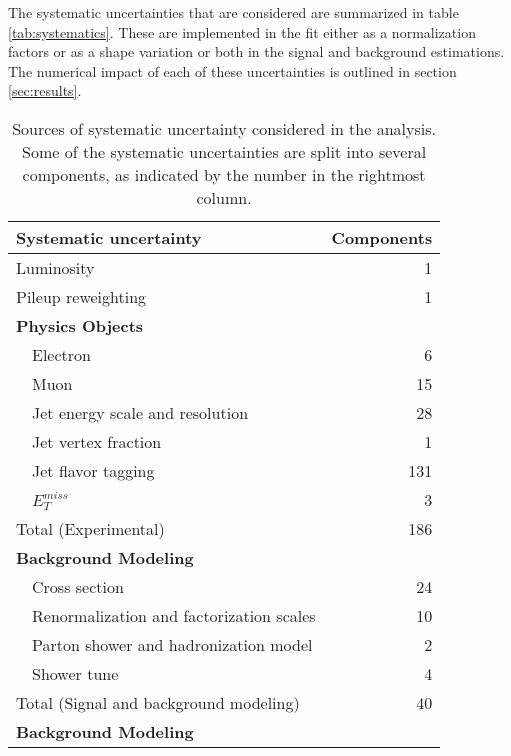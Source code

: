 The systematic uncertainties that are considered are summarized in table \ref{tab:systematics}. These are implemented in the fit either as a normalization factors or as a shape variation or both in the signal and background estimations. The numerical impact of each of these uncertainties is outlined in section \ref{sec:results}.

\begin{table}[h]
\centering
\caption{Sources of systematic uncertainty considered in the analysis.                                                                           
Some of the systematic uncertainties are split into several components, as indicated by the number in the rightmost column.}
\begin{tabular}{lr}
\hline\hline
Systematic uncertainty & Components           \\
\hline
\hline
Luminosity      & 1                   \\
Pileup reweighting      & 1                   \\
\textbf {Physics Objects}       &                     \\
\ \ Electron                                    & 6                   \\
\ \ Muon        & 15                  \\
\ \ Jet energy scale and resolution     & 28                  \\
\ \ Jet vertex fraction         & 1                   \\
\ \ Jet flavor tagging          & 131                 \\
\ \ $E^{miss}_T$        & 3                   \\
\hline
Total (Experimental)        & 186                    \\
\hline
\hline
\textbf {Background Modeling}           &                     \\
\ \ Cross section                       & 24                  \\
\ \ Renormalization and factorization scales    & 10                  \\
\ \ Parton shower and hadronization model               & 2                   \\
\ \ Shower tune                         & 4                   \\
\hline
Total (Signal and background modeling)       & 40                    \\
\hline
\hline
\textbf {Background Modeling}           &                     \\

\end{tabular}
\end{table}
